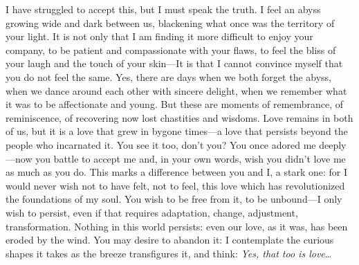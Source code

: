 \documentclass[a4paper, 12pt]{article}
\begin{document}
I have struggled to accept this, but I must speak the truth. I feel an abyss
growing wide and dark between us, blackening what once was the territory of
your light. It is not only that I am finding it more difficult to enjoy your
company, to be patient and compassionate with your flaws, to feel the bliss of
your laugh and the touch of your skin---It is that I cannot convince myself
that you do not feel the same. Yes, there are days when we both forget the
abyss, when we dance around each other with sincere delight, when we remember
what it was to be affectionate and young. But these are moments of
remembrance, of reminiscence, of recovering now lost chastities and wisdoms.
Love remains in both of us, but it is a love that grew in bygone times---a love
that persists beyond the people who incarnated it. You see it too, don't you?
You once adored me deeply---now you battle to accept me and, in your own words,
wish you didn't love me as much as you do. This marks a difference between 
you and I, a stark one: for I would never wish not to have felt, not to feel,
this love which has revolutionized the foundations of my soul. You wish 
to be free from it, to be unbound---I only wish to persist,
even if that requires adaptation, change, adjustment, transformation. Nothing 
in this world persists: even our love, as it was, has been eroded by the wind.
You may desire to abandon it: I contemplate the curious shapes it takes as the 
breeze transfigures it, and think: \textit{Yes, that too is love}\ldots 
\end{document}
